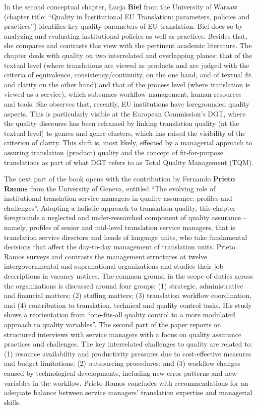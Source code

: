 \documentclass[output=paper]{langsci/langscibook}
\begin{document}
In the second conceptual chapter, Łucja \textbf{Biel} from the University of Warsaw (chapter title: “Quality in Institutional EU Translation: parameters, policies and practices”) identifies key quality parameters of EU translation. Biel does so by analyzing and evaluating institutional policies as well as practices. Besides that, she compares and contrasts this view with the pertinent academic literature. The chapter deals with quality on two interrelated and overlapping planes: that of the textual level (where translations are viewed as products and are judged with the criteria of equivalence, consistency/continuity, on the one hand, and of textual fit and clarity on the other hand) and that of the process level (where translation is viewed as a service), which subsumes workflow management, human resources and tools. She observes that, recently, EU institutions have foregrounded quality aspects. This is particularly visible at the European Commission’s DGT, where the quality discourse has been reframed by linking translation quality (at the textual level) to genres and genre clusters, which has raised the visibility of the criterion of clarity. This shift is, most likely, effected by a managerial approach to assuring translation (product) quality and the concept of fit-for-purpose translations as part of what DGT refers to as Total Quality Management (TQM). 

The next part of the book opens with the contribution by Fernando \textbf{Prieto Ramos} from the University of Geneva, entitled “The evolving role of institutional translation service managers in quality assurance: profiles and challenges”. Adopting a holistic approach to translation quality, this chapter foregrounds a neglected and under-researched component of quality assurance – namely, profiles of senior and mid-level translation service managers, that is translation service directors and heads of language units, who take fundamental decisions that affect the day-to-day management of translation units. Prieto Ramos surveys and contrasts the management structures at twelve intergovernmental and supranational organizations and studies their job descriptions in vacancy notices. The common ground in the scope of duties across the organizations is discussed around four groups: (1) strategic, administrative and financial matters; (2) staffing matters; (3) translation workflow coordination, and (4) contribution to translation, technical and quality control tasks. His study shows a reorientation from “one-fits-all quality control to a more modulated approach to quality variables”. The second part of the paper reports on structured interviews with service managers with a focus on quality assurance practices and challenges. The key interrelated challenges to quality are related to: (1) resource availability and productivity pressures due to cost-effective measures and budget limitations; (2) outsourcing procedures; and (3) workflow changes caused by technological developments, including new error patterns and new variables in the workflow. Prieto Ramos concludes with recommendations for an adequate balance between service managers’ translation expertise and managerial skills.
\end{document}
